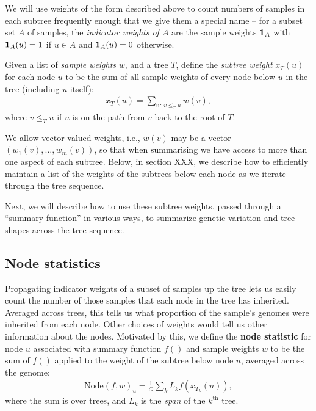 \documentclass{article}
\newcommand{\node}{\mbox{Node}} %
\newcommand{\iw}{w} %
\newcommand{\nw}{x} %
\begin{document}
We will use weights of the form described above to count numbers of samples in each subtree
frequently enough that we give them a special name --
for a subset set $A$ of samples,
the \emph{indicator weights of $A$} are the sample weights $\mathbf{1}_A$ with
$\mathbf{1}_A(u) = 1$ if $u \in A$ and $\mathbf{1}_A(u) = 0$ otherwise.

\begin{definition}
    Given a list of \emph{sample weights} $w$, and a tree $T$,
    define the \emph{subtree weight} $\nw_T(u)$ for each node $u$ to be the sum of all sample weights
    of every node below $u$ in the tree (including $u$ itself):
    \begin{align*}
        \nw_T(u) = \sum_{v \,:\, v \le_T u} \iw(v) ,
    \end{align*}
    where $v \le_T u$ if $u$ is on the path from $v$ back to the root of $T$.
\end{definition}

We allow vector-valued weights,
i.e., $\iw(v)$ may be a vector $(\iw_1(v), \ldots, \iw_m(v))$,
so that when summarising we have access to more than one aspect of each subtree.
Below, in section XXX, we describe how to efficiently
maintain a list of the weights of the subtrees below each node
as we iterate through the tree sequence.

Next, we will describe how to use these subtree weights,
passed through a ``summary function'' in various ways,
to summarize genetic variation and tree shapes across the tree sequence.

\subsection*{Node statistics}

Propagating indicator weights of a subset of samples up the tree
lets us easily count the number of those samples that each node in the tree has inherited.
Averaged across trees,
this tells us what proportion of the sample's genomes were inherited from each node.
Other choices of weights would tell us other information about the nodes.
Motivated by this, we define the
\textbf{node statistic} for node $u$
associated with summary function $f()$ and sample weights $\iw$
to be the sum of $f()$ applied to the weight of the subtree below node $u$,
averaged across the genome:
\begin{align}
    \node(f, \iw)_u
    =
    \frac{1}{G} \sum_k L_k f(\nw_{T_k}(u)) ,
\end{align}
where the sum is over trees, and $L_k$ is the \emph{span} of the $k^\text{th}$ tree.
\end{document}
